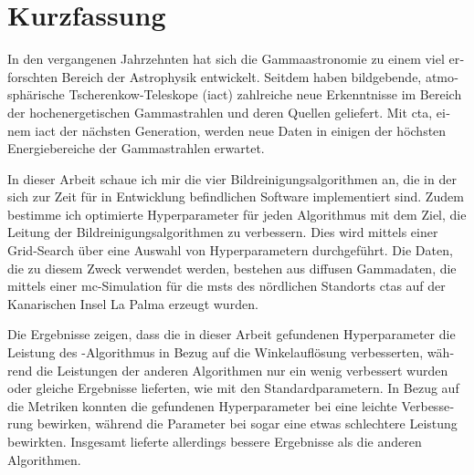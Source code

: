 \section*{Kurzfassung}
\begin{otherlanguage}{ngerman}
In den vergangenen Jahrzehnten hat sich die Gammaastronomie zu einem viel erforschten Bereich der
Astrophysik entwickelt. Seitdem haben bildgebende, atmosphärische Tscherenkow-Teleskope (\gls{iact})
zahlreiche neue Erkenntnisse im Bereich der hochenergetischen Gammastrahlen und deren Quellen geliefert.
Mit \gls{cta}, einem \gls{iact} der nächsten Generation, werden neue Daten in einigen der höchsten
Energiebereiche der Gammastrahlen erwartet.

In dieser Arbeit schaue ich mir die vier Bildreinigungsalgorithmen an, die in der sich zur Zeit für \cta{}
in Entwicklung befindlichen Software \ctapipe{} implementiert sind. Zudem bestimme ich optimierte
Hyperparameter für jeden Algorithmus mit dem Ziel, die Leitung der Bildreinigungsalgorithmen zu verbessern.
Dies wird mittels einer Grid-Search über eine Auswahl von Hyperparametern durchgeführt. Die Daten, die zu diesem
Zweck verwendet werden, bestehen aus diffusen Gammadaten, die mittels einer \gls{mc}-Simulation für die
\glspl{mst} des nördlichen Standorts \gls{cta}s auf der Kanarischen Insel La Palma erzeugt wurden.

Die Ergebnisse zeigen, dass die in dieser Arbeit gefundenen Hyperparameter die Leistung des \tcc{}-Algorithmus
in Bezug auf die Winkelauflösung verbesserten, während die Leistungen der anderen Algorithmen nur ein wenig
verbessert wurden oder gleiche Ergebnisse lieferten, wie mit den Standardparametern.
In Bezug auf die Metriken konnten die gefundenen Hyperparameter bei \tcc{} eine leichte Verbesserung
bewirken, während die Parameter bei \fact{} sogar eine etwas schlechtere Leistung bewirkten.
Insgesamt lieferte \fact{} allerdings bessere Ergebnisse als die anderen Algorithmen.
\end{otherlanguage}
\glsresetall
